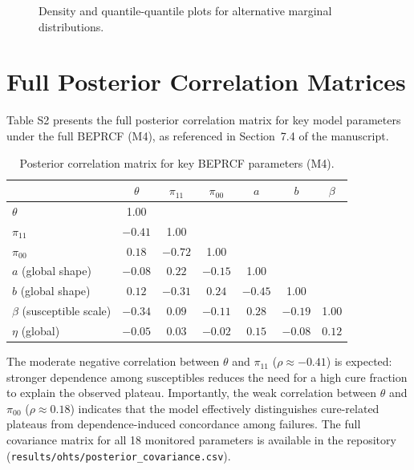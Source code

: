 \documentclass[12pt,a4paper]{article}
\begin{document}
\begin{figure}[H]
\centering
{}
\caption{Density and quantile-quantile plots for alternative marginal distributions.}
\label{fig:S1}
\end{figure}

\section{Full Posterior Correlation Matrices}

Table S2 presents the full posterior correlation matrix for key model parameters under the full BEPRCF (M4), as referenced in Section~7.4 of the manuscript.

\begin{table}[H]
\centering
\caption{Posterior correlation matrix for key BEPRCF parameters (M4).}
\label{tab:S2}
\begin{tabular}{lcccccc}
\toprule
& $\theta$ & $\pi_{11}$ & $\pi_{00}$ & $a$ & $b$ & $\beta$ \\
\midrule
$\theta$ & 1.00 & & & & & \\
$\pi_{11}$ & $-0.41$ & 1.00 & & & & \\
$\pi_{00}$ & $0.18$ & $-0.72$ & 1.00 & & & \\
$a$ (global shape) & $-0.08$ & $0.22$ & $-0.15$ & 1.00 & & \\
$b$ (global shape) & $0.12$ & $-0.31$ & $0.24$ & $-0.45$ & 1.00 & \\
$\beta$ (susceptible scale) & $-0.34$ & $0.09$ & $-0.11$ & $0.28$ & $-0.19$ & 1.00 \\
$\eta$ (global) & $-0.05$ & $0.03$ & $-0.02$ & $0.15$ & $-0.08$ & $0.12$ \\
\bottomrule
\end{tabular}
\end{table}

The moderate negative correlation between $\theta$ and $\pi_{11}$ ($\rho \approx -0.41$) is expected: stronger dependence among susceptibles reduces the need for a high cure fraction to explain the observed plateau. Importantly, the weak correlation between $\theta$ and $\pi_{00}$ ($\rho \approx 0.18$) indicates that the model effectively distinguishes cure-related plateaus from dependence-induced concordance among failures. The full covariance matrix for all 18 monitored parameters is available in the repository (\texttt{results/ohts/posterior\_covariance.csv}).
\end{document}

